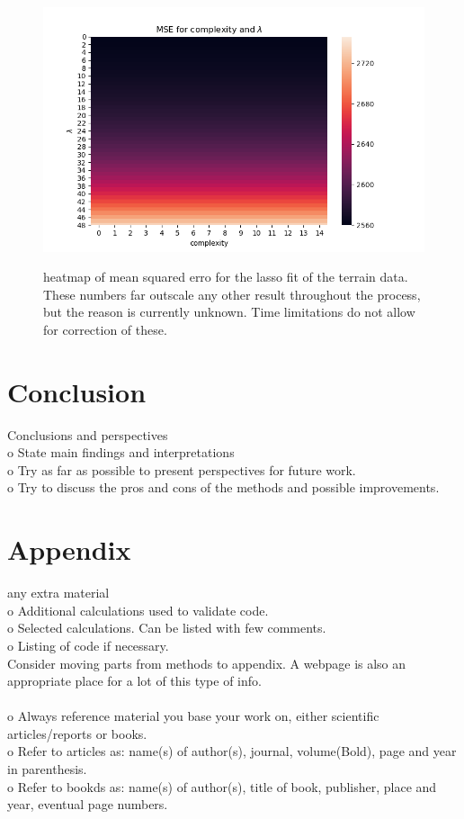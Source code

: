 \documentclass[ 12pt, a4paper ]{article}
\begin{document}
\begin{figure}[H]
\includegraphics[scale=0.7]{nordatalassomseheatmap.png}
\label{fig:nordatalassomseheatmap}
\caption{
    heatmap of mean squared erro for the lasso fit of the terrain data. These numbers far 
    outscale any other result throughout the process, but the reason is currently unknown. 
    Time limitations do not allow for correction of these. 
}
\end{figure}




\section{Conclusion}
    Conclusions and perspectives\\
    o   State main findings and interpretations \\
    o   Try as far as possible to present perspectives for future work. \\
    o   Try to discuss the pros and cons of the methods and possible improvements. \\
\section{Appendix}
    any extra material \\
    o   Additional calculations used to validate code. \\
    o   Selected calculations. Can be listed with few comments. \\
    o   Listing of code if necessary. \\
    Consider moving parts from methods to appendix. A webpage is also an appropriate place
    for a lot of this type of info. \\\\

    o   Always reference material you base your work on, either scientific articles/reports
        or books. \\
    o   Refer to articles as: name(s) of author(s), journal, volume(Bold), page and year in
        parenthesis. \\
    o   Refer to bookds as: name(s) of author(s), title of book, publisher, place and year, 
        eventual page numbers. \\
\end{document}
